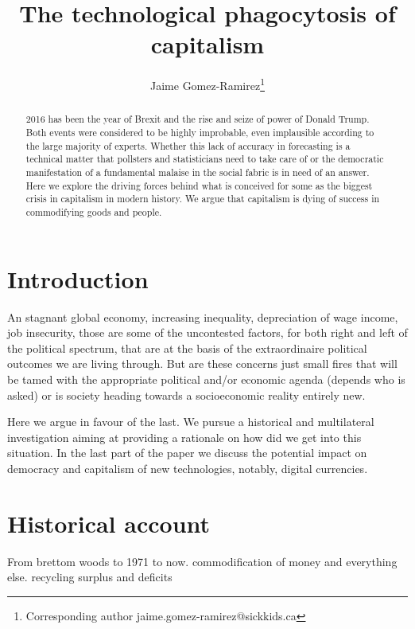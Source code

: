 \documentclass[11pt, onecolumn]{article}
\begin{document}
\title{The technological phagocytosis of capitalism}

\author[1]{Jaime Gomez-Ramirez\thanks{Corresponding author \hspace{0.6cm} jaime.gomez-ramirez@sickkids.ca}}
\affil[1]{}
\date{}
\maketitle

\begin{abstract}

2016 has been the year of Brexit and the rise and seize of power of Donald Trump. Both events were considered to be highly improbable, even implausible  according to the large majority of experts.
Whether this lack of accuracy in forecasting is a technical matter that  pollsters and statisticians need to take care of or the democratic manifestation of a fundamental malaise in the social fabric is in need of an answer.
Here we explore the driving forces behind what is conceived for some as the biggest crisis in capitalism in modern history. We argue that capitalism is dying of   success in commodifying goods and people. 

\end{abstract}

\section{Introduction}
\label{se:intro}

An stagnant global economy, increasing inequality, depreciation of wage income, job insecurity, those are some of the uncontested factors, for both right and left of the political spectrum, that are at the basis of the extraordinaire political outcomes we are living through.
But are these concerns just small fires that will be tamed with the appropriate political and/or economic agenda (depends who is asked) or is society heading towards a  socioeconomic reality entirely new.

Here we argue in favour of the last. We pursue a historical and multilateral investigation aiming at providing a rationale on how did we get into this situation. In the last part of the paper we discuss the potential impact on democracy and capitalism of new technologies, notably, digital currencies. 

\section{Historical account}
\label{se:hisacc}
From brettom woods to 1971 to now. 
commodification of money and everything else.
recycling surplus and deficits
\end{document}
